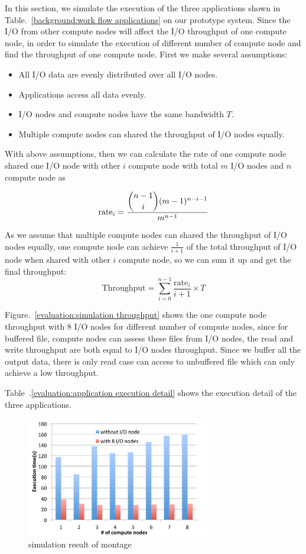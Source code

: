 In this section, we simulate the execution of the three applications shown in
Table.~\ref{background:work flow applications} on our prototype system.
Since the I/O from other compute nodes will affect the I/O throughput of one compute node,
in order to simulate the execution of different number of compute node and find the throughput of
one compute node.
First we make several assumptions:
\begin{itemize}
  \item All I/O data are evenly distributed over all I/O nodes.
  \item Applications access all data evenly.
  \item I/O nodes and compute nodes have the same bandwidth $T$.
  \item Multiple compute nodes can shared the throughput of I/O nodes equally.
\end{itemize}

With above assumptions, then we can calculate the rate of one compute node shared one I/O node with
other $i$ compute node with total $m$ I/O nodes and $n$ compute node as

\begin{equation}
\text{rate}_i=\frac{\dbinom{n-1}{i}(m-1)^{n-i-1}}{m^{n-1}}
\end{equation}

As we assume that multiple compute nodes can shared the throughput of I/O nodes equally, one
compute node can achieve $\frac{1}{i+1}$ of the total throughput of I/O node when shared with other
$i$ compute node, so we can sum it up and get the final throughput:
\begin{equation}
\text{Throughput}=\sum_{i=0}^{n-1} \frac{\text{rate}_i}{i+1} \times T
\end{equation}

Figure.~\ref{evaluation:simulation throughput} shows the one compute node throughput with 8 I/O
nodes for different number of compute nodes, since for buffered file, compute nodes can assess these
files from I/O nodes, the read and write throughput are both equal to I/O nodes throughput.
Since we buffer all the output data, there is only read case can access to unbuffered file which
can only achieve a low throughput.

Table~.\ref{evaluation:application execution detail} shows the execution detail of the three
applications.

\begin{figure}
\centering
\includegraphics[width=8cm]{img/simulation_montage}
\caption{simulation result of montage}
\label{evaluation:simulation result montage}
\end{figure}


